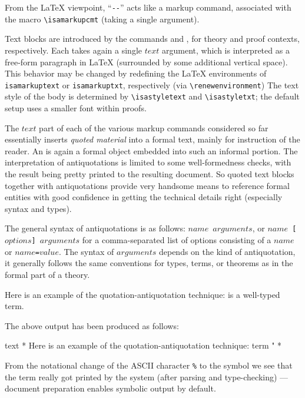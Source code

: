 \begin{isabellebody}
\begin{isamarkuptext}
  From the {\LaTeX} viewpoint, ``\verb,--,'' acts like a markup
  command, associated with the macro \verb,\isamarkupcmt, (taking a
  single argument).

  \medskip Text blocks are introduced by the commands 
  and , for theory and proof contexts, respectively.
  Each takes again a single $text$ argument, which is interpreted as a
  free-form paragraph in {\LaTeX} (surrounded by some additional
  vertical space).  This behavior may be changed by redefining the
  {\LaTeX} environments of \verb,isamarkuptext, or
  \verb,isamarkuptxt,, respectively (via \verb,\renewenvironment,) The
  text style of the body is determined by \verb,\isastyletext, and
  \verb,\isastyletxt,; the default setup uses a smaller font within
  proofs.

  \medskip The $text$ part of each of the various markup commands
  considered so far essentially inserts \emph{quoted material} into a
  formal text, mainly for instruction of the reader.  An
   is again a formal object embedded into such
  an informal portion.  The interpretation of antiquotations is
  limited to some well-formedness checks, with the result being pretty
  printed to the resulting document.  So quoted text blocks together
  with antiquotations provide very handsome means to reference formal
  entities with good confidence in getting the technical details right
  (especially syntax and types).

  The general syntax of antiquotations is as follows:
  \texttt{{\at}{\ttlbrace}$name$ $arguments${\ttrbrace}}, or
  \texttt{{\at}{\ttlbrace}$name$ [$options$] $arguments${\ttrbrace}}
  for a comma-separated list of options consisting of a $name$ or
  \texttt{$name$=$value$}.  The syntax of $arguments$ depends on the
  kind of antiquotation, it generally follows the same conventions for
  types, terms, or theorems as in the formal part of a theory.

  \medskip Here is an example of the quotation-antiquotation
  technique:  is a well-typed term.

  \medskip\noindent The above output has been produced as follows:
  \begin{ttbox}
text {\ttlbrace}*
  Here is an example of the quotation-antiquotation technique:
  {\at}{\ttlbrace}term "%
*{\ttrbrace}
  \end{ttbox}

  From the notational change of the ASCII character \verb,%, to the
  symbol \isa{{\isasymlambda}} we see that the term really got printed by the
  system (after parsing and type-checking) --- document preparation
  enables symbolic output by default.


\end{isamarkuptext}
\end{isabellebody}
